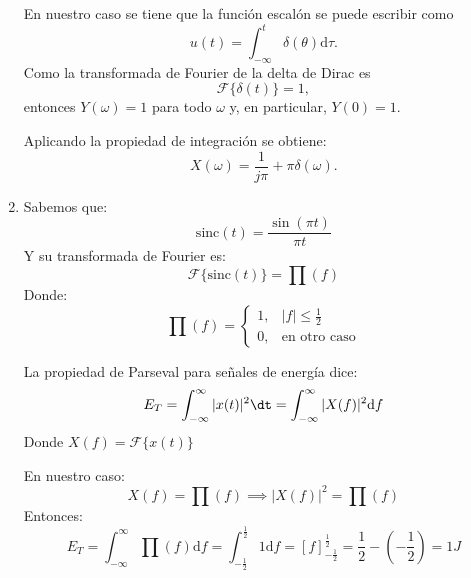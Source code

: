 \begin{enumerate}[label=\color{red}\textbf{\arabic*)}]
   En nuestro caso se tiene que la función escalón se puede escribir como \[
   u(t)=\int_{-\infty}^{t} \delta(\theta) \mathrm{d}\tau.
   \] 
   Como la transformada de Fourier de la delta de Dirac es \[
   \mathcal{F}\{\delta(t)\} =1,
   \] entonces $Y(\omega)=1$ para todo $\omega$ y, en particular, $Y(0)=1$.

   Aplicando la propiedad de integración se obtiene:  \[
   X(\omega)=\dfrac{1}{j\pi}+\pi\delta(\omega).
   \] 
\item {} 

    \begin{minipage}{0.45\textwidth}
    \end{minipage}\qquad
    \begin{minipage}{0.45\textwidth}
        Sabemos que: \[
        \text{sinc}(t)=\dfrac{\sin(\pi t)}{\pi t}
        \] 
        Y su transformada de Fourier es: \[
        \mathcal{F}\{\text{sinc}(t)\} =\prod(f)
        \] 
        Donde: \[
        \prod(f)=\begin{cases}
            1, & |f|\le \frac{1}{2}\\
            0, & \text{en otro caso}
        \end{cases}
        \] 
    \end{minipage}

    La propiedad de Parseval para señales de energía dice: \[
    E_T=\int_{-\infty}^{\infty} |x(t)|^2\dt=\int_{-\infty}^{\infty} |X(f)|^2\mathrm{d}f
    \] 
    Donde $X(f)=\mathcal{F}\{x(t)\} $ 

    En nuestro caso: \[
    X(f)=\prod(f)\implies|X(f)|^2=\prod(f)
    \] 
    Entonces: \[
        E_T=\int_{-\infty}^{\infty} \prod(f)\mathrm{d}f =\int_{-\frac{1}{2} }^{\frac{1}{2} } 1\mathrm{d}f=[f]_{-\frac{1}{2} }^{\frac{1}{2} }=\dfrac{1}{2}-\left( -\dfrac{1}{2} \right)=1J
    \] 


\end{enumerate}

